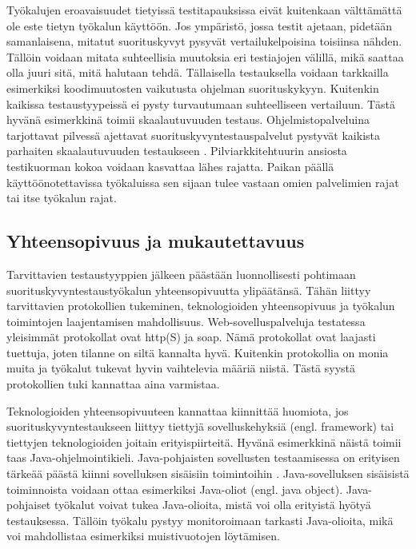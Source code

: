 Työkalujen eroavaisuudet tietyissä testitapauksissa eivät kuitenkaan välttämättä ole este tietyn työkalun käyttöön. Jos ympäristö, jossa testit ajetaan, pidetään samanlaisena, mitatut suorituskyvyt pysyvät vertailukelpoisina toisiinsa nähden. Tällöin voidaan mitata suhteellisia muutoksia eri testiajojen välillä, mikä saattaa olla juuri sitä, mitä halutaan tehdä. Tällaisella testauksella voidaan tarkkailla esimerkiksi koodimuutosten vaikutusta ohjelman suorituskykyyn. Kuitenkin kaikissa testaustyypeissä ei pysty turvautumaan suhteelliseen vertailuun. Tästä hyvänä esimerkkinä toimii skaalautuvuuden testaus. Ohjelmistopalveluina tarjottavat pilvessä ajettavat suorituskyvyntestauspalvelut pystyvät kaikista parhaiten skaalautuvuuden testaukseen \parencite{PerformanceTestingMethodologiesAndTools}. Pilviarkkitehtuurin ansiosta testikuorman kokoa voidaan kasvattaa lähes rajatta. Paikan päällä käyttöönotettavissa työkaluissa sen sijaan tulee vastaan omien palvelimien rajat tai itse työkalun rajat.


\subsection{Yhteensopivuus ja mukautettavuus}
\label{ssec:yhteensopivuus}
Tarvittavien testaustyyppien jälkeen päästään luonnollisesti pohtimaan suorituskyvyntestaustyökalun yhteensopivuutta ylipäätänsä. Tähän liittyy tarvittavien protokollien tukeminen, teknologioiden yhteensopivuus ja työkalun toimintojen laajentamisen mahdollisuus. Web-sovelluspalveluja testatessa yleisimmät protokollat ovat \acrshort{http}(S) ja \acrshort{soap}. Nämä protokollat ovat laajasti tuettuja, joten tilanne on siltä kannalta hyvä. Kuitenkin protokollia on monia muita ja työkalut tukevat hyvin vaihtelevia määriä niistä. \parencite{Top27PerformanceTestingTools} Tästä syystä protokollien tuki kannattaa aina varmistaa.

Teknologioiden yhteensopivuuteen kannattaa kiinnittää huomiota, jos suorituskyvyntestaukseen liittyy tiettyjä sovelluskehyksiä (engl. framework) tai tiettyjen teknologioiden joitain erityispiirteitä. Hyvänä esimerkkinä näistä toimii taas Java-ohjelmointikieli. Java-poh\-jais\-ten sovellusten testaamisessa on erityisen tärkeää päästä kiinni sovelluksen sisäisiin toimintoihin \parencite[208]{TheArtOfApplication}. Java-sovelluksen sisäisistä toiminnoista voidaan ottaa esimerkiksi Java-oliot (engl. java object). Java-pohjaiset työkalut voivat tukea Java-olioita, mistä voi olla erityistä hyötyä testauksessa. Tällöin työkalu pystyy monitoroimaan tarkasti Java-olioita, mikä voi mahdollistaa esimerkiksi muistivuotojen löytämisen.

